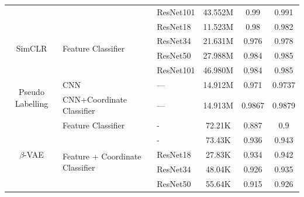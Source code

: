 \documentclass{article}
\begin{document}
\begin{table}[!htp]
\begin{tabular}{cllccc}
                                      &                                                  & ResNet101         & 43.552M           & 0.99              & 0.991             \\ \cmidrule{1-6}
    \multirow{4}{*}{SimCLR}           & \multirow{4}{*}{Feature Classifier}              & ResNet18          & 11.523M           & 0.98              & 0.982             \\
                                      &                                                  & ResNet34          & 21.631M           & 0.976             & 0.978             \\
                                      &                                                  & ResNet50          & 27.988M           & 0.984             & 0.985             \\
                                      &                                                  & ResNet101         & 46.980M           & 0.984             & 0.985             \\ \cmidrule{1-6}
    \multirow{2}{*}{Pseudo Labelling} & CNN                                              & ---               & 14.912M           & 0.971             & 0.9737            \\
                                      & CNN+Coordinate Classifier                        & ---               & 14.913M           & 0.9867            & 0.9879            \\\cmidrule{1-6}
    \multirow{6}{*}{$\beta$-VAE}      & Feature Classifier                               & -                 & 72.21K            & 0.887             & 0.9               \\\cmidrule{2-6}
                                      & \multirow{5}{*}{Feature + Coordinate Classifier} & -                 & 73.43K            & 0.936             & 0.943             \\
                                      &                                                  & ResNet18          & 27.83K            & 0.934             & 0.942             \\
                                      &                                                  & ResNet34          & 48.04K            & 0.926             & 0.935             \\
                                      &                                                  & ResNet50          & 55.64K            & 0.915             & 0.926             \\

\end{tabular}
\end{table}
\end{document}
